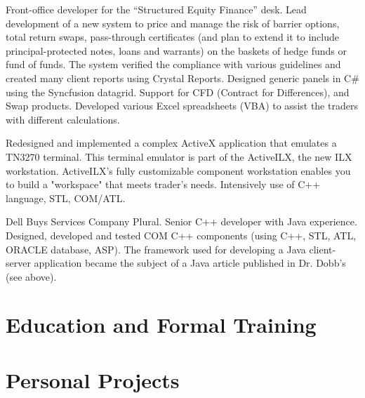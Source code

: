 \documentclass[8pt,a4paper,sans]{moderncv}
\begin{document}
        {Front-office developer for the ``Structured Equity Finance'' desk.
          Lead development of a new system to price and manage the risk of barrier options, total return swaps,
          pass-through certificates (and plan to extend it to include principal-protected notes, loans and warrants)
          on the baskets of hedge funds or fund of funds.
          The system verified the compliance with various guidelines and created many client reports using Crystal Reports.
          Designed generic panels in C\# using the Syncfusion datagrid.
          Support for CFD (Contract for Differences), and Swap products.
          Developed various Excel spreadsheets (VBA) to assist the traders with different calculations.}

        {Redesigned and implemented a complex ActiveX application that emulates a TN3270 terminal.
          This terminal emulator is part of the ActiveILX, the new ILX workstation. ActiveILX's fully
          customizable component workstation enables you to build a "workspace" that meets trader's needs. 
          Intensively use of C++ language, STL, COM/ATL.}

        {Dell Buys Services Company Plural.
          Senior C++ developer with Java experience.
          Designed, developed and tested COM C++ components (using C++, STL, ATL, ORACLE database, ASP).
          The framework used for developing a Java client-server application became the subject of a Java article
          published in Dr. Dobb's (see above).}

\section{Education and Formal Training}

\section{Personal Projects}
        
\end{document}
